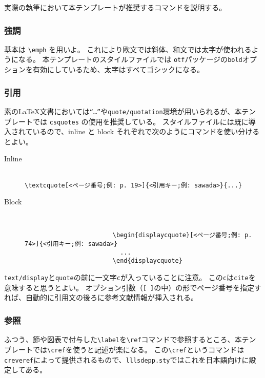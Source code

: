 			実際の執筆において本テンプレートが推奨するコマンドを説明する。

			\subsubsection{強調}

				基本は \texttt{\textbackslash emph} を用いよ。
				これにより欧文では斜体、和文では太字が使われるようになる。
				本テンプレートのスタイルファイルでは \texttt{otf}パッケージの\texttt{bold}オプションを有効にしているため、太字はすべてゴシックになる。

			\subsubsection{引用}

				素の\LaTeX 文書においては\texttt{``\dots''}や\texttt{quote/quotation}環境が用いられるが、本テンプレートでは \texttt{csquotes} の使用を推奨している。
				スタイルファイルには既に導入されているので、inline と block それぞれで次のようにコマンドを使い分けるとよい。

				\begin{description}
					\item[Inline] 　\\
						\verb|\textcquote[<ページ番号;例: p. 19>]{<引用キー;例: sawada>}{...}|
					\item[Block] 　
					\begin{verbatim}
						\begin{displaycquote}[<ページ番号;例: p. 74>]{<引用キー;例: sawada>}
						  ...
						\end{displaycquote}
					\end{verbatim}
				\end{description}

				\noindent
				\texttt{text/display}と\texttt{quote}の前に一文字\texttt{c}が入っていることに注意。
				この\texttt{c}は\texttt{cite}を意味すると思うとよい。
				オプション引数（\texttt{[ ]}の中）の形でページ番号を指定すれば、自動的に引用文の後ろに参考文献情報が挿入される。

			\subsubsection{参照}

				ふつう、節や図表で付与した\verb|\label|を\verb|\ref|コマンドで参照するところ、本テンプレートでは\verb|\cref|を使うと記述が楽になる。
				この\verb|\cref|というコマンドは\texttt{creveref}によって提供されるもので、\texttt{lllsdepp.sty}ではこれを日本語向けに設定してある。

